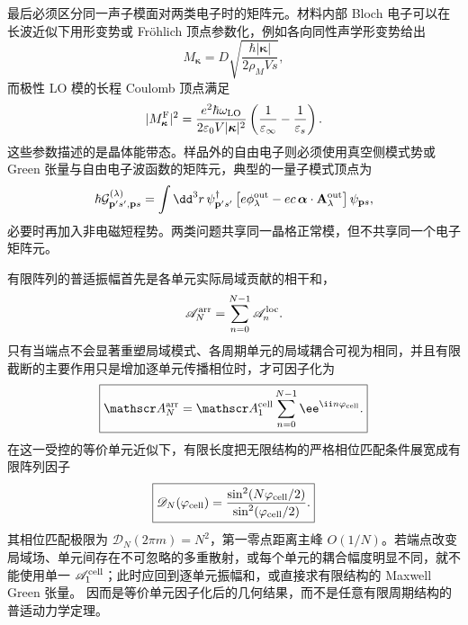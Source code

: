 最后必须区分同一声子模面对两类电子时的矩阵元。材料内部 Bloch 电子可以在长波近似下用形变势或 Fr\"ohlich 顶点参数化，例如各向同性声学形变势给出
\begin{equation*}
M_{\boldsymbol\kappa}=D\sqrt{\frac{\hbar|\boldsymbol\kappa|}{2\rho_MVs}},
\end{equation*}
而极性 LO 模的长程 Coulomb 顶点满足
\begin{equation*}
|M_{\boldsymbol\kappa}^{\rm F}|^2
=\frac{e^2\hbar\omega_{\rm LO}}{2\varepsilon_0V|\boldsymbol\kappa|^2}
\left(\frac1{\varepsilon_\infty}-\frac1{\varepsilon_s}\right).
\end{equation*}
这些参数描述的是晶体能带态。样品外的自由电子则必须使用真空侧模式势或 Green 张量与自由电子波函数的矩阵元，典型的一量子模式顶点为
\begin{equation*}
\hbar\mathcal G_{\mathbf p's',\mathbf ps}^{(\lambda)}
=\int \dd^3 r\,\psi_{\mathbf p's'}^\dagger
\left[e\phi_\lambda^{\rm out}-ec\,\boldsymbol\alpha\cdot\mathbf A_\lambda^{\rm out}\right]
\psi_{\mathbf ps},
\end{equation*}
必要时再加入非电磁短程势。两类问题共享同一晶格正常模，但不共享同一个电子矩阵元。

有限阵列的普适振幅首先是各单元实际局域贡献的相干和，
\begin{equation*}
\mathscr A_N^{\rm arr}
=\sum_{n=0}^{N-1}\mathscr A_n^{\rm loc}.
\end{equation*}
只有当端点不会显著重塑局域模式、各周期单元的局域耦合可视为相同，并且有限截断的主要作用只是增加逐单元传播相位时，才可因子化为
\begin{equation}
\boxed{
\mathscr A_N^{\rm arr}
=\mathscr A_1^{\rm cell}\sum_{n=0}^{N-1}\ee^{\ii n\varphi_{\rm cell}}.}
\label{eq:finite-periodic-array-amplitude-dp68}
\end{equation}
在这一受控的等价单元近似下，有限长度把无限结构的严格相位匹配条件展宽成有限阵列因子
\begin{equation}
\boxed{
\mathscr D_N(\varphi_{\rm cell})
=\frac{\sin^2(N\varphi_{\rm cell}/2)}
{\sin^2(\varphi_{\rm cell}/2)}.}
\label{eq:finite-periodic-array-factor-dp68}
\end{equation}
其相位匹配极限为 $\mathscr D_N(2\pi m)=N^2$，第一零点距离主峰 $O(1/N)$。若端点改变局域场、单元间存在不可忽略的多重散射，或每个单元的耦合幅度明显不同，就不能使用单一 $\mathscr A_1^{\rm cell}$；此时应回到逐单元振幅和，或直接求有限结构的 Maxwell Green 张量。 因而是等价单元因子化后的几何结果，而不是任意有限周期结构的普适动力学定理。


